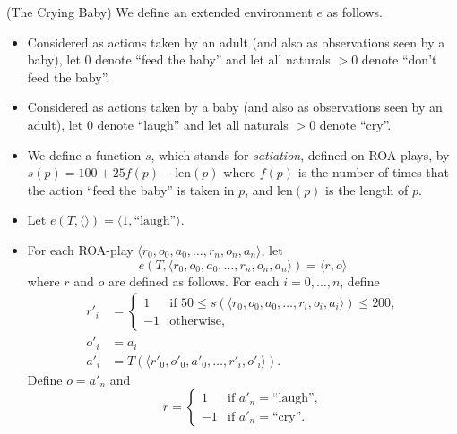 \documentclass[runningheads]{llncs}
\begin{document}
\begin{example}
\label{cryingbabyexample}
    (The Crying Baby)
    We define an extended environment $e$ as follows.
    \begin{itemize}
        \item
        Considered as actions taken by an adult
        (and also as observations seen by a baby), let $0$ denote ``feed the baby''
        and let all naturals $>0$ denote ``don't feed the baby''.
        \item
        Considered as actions taken by a baby
        (and also as observations seen by an adult), let $0$ denote ``laugh'' and let
        all naturals $>0$ denote ``cry''.
        \item
        We define a function $s$, which stands for \emph{satiation}, defined on
        ROA-plays, by $s(p)=100+25f(p)-\mbox{len}(p)$ where $f(p)$ is the number of
        times that the action ``feed the baby'' is taken in $p$,
        and $\mbox{len}(p)$ is the length of $p$.
        \item
        Let $e(T,\langle\rangle)=\langle 1,\mbox{``laugh''}\rangle$.
        \item
        For each ROA-play $\langle r_0,o_0,a_0,\ldots,r_n,o_n,a_n\rangle$,
        let
        \[
            e(T,\langle r_0,o_0,a_0,\ldots,r_n,o_n,a_n\rangle)
            =
            \langle r,o\rangle
        \]
        where $r$ and $o$ are defined as follows.
        For each $i=0,\ldots,n$, define
        \begin{align*}
            r'_i &=
                \begin{cases}
                    1 &
                    \mbox{if
                    $50\leq s(\langle r_0,o_0,a_0,\ldots,r_i,o_i,a_i\rangle)\leq 200$,}\\
                    -1 & \mbox{otherwise,}
                \end{cases}\\
            o'_i &= a_i\\
            a'_i &= T(\langle r'_0,o'_0,a'_0,\ldots,r'_i,o'_i\rangle).
        \end{align*}
        Define $o=a'_n$ and
        \[
            r =
            \begin{cases}
                1 & \mbox{if $a'_n=\mbox{``laugh''}$,}\\
                -1 &\mbox{if $a'_n=\mbox{``cry''}$.}
            \end{cases}
        \]
    \end{itemize}
\end{example}
\end{document}
